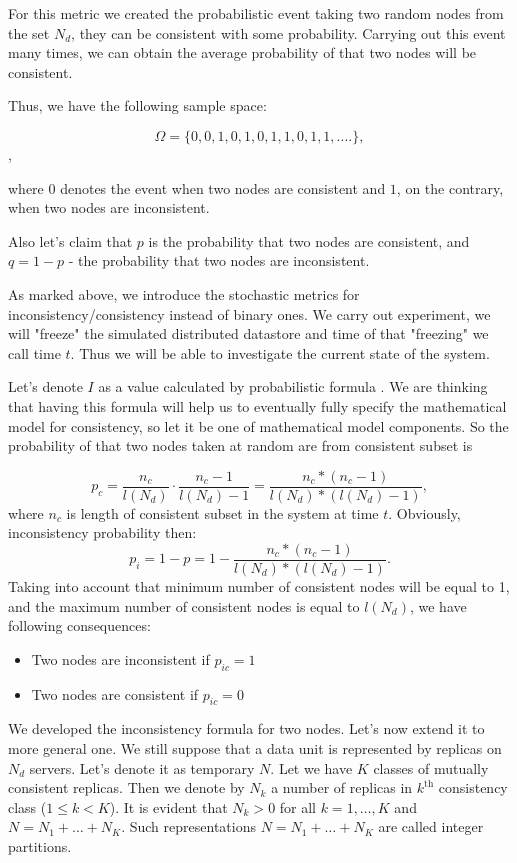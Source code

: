 \documentclass[a4paper,14pt]{llncs}
\begin{document}
For this metric we created the probabilistic event taking two random nodes from the set $N_d$, they can be consistent with some probability. Carrying out this event many times, we can obtain the average probability of that two nodes will be consistent.


Thus, we have the following sample space:

\[\Omega = \{0, 0, 1, 0, 1, 0, 1 , 1, 0, 1, 1, ....\}, \],

where $0$ denotes the event when two nodes are consistent and $1$, on the contrary, when two nodes are inconsistent.

Also let's claim that $p$ is the probability that two nodes are consistent, and
$q = 1 -p$ - the probability that two nodes are inconsistent.


As marked above, we introduce the stochastic metrics for inconsistency/consistency instead of binary ones.
We carry out experiment, we will "freeze" the simulated distributed datastore and time of that "freezing" we call time $t$. Thus we will be able to investigate the current state of the system.

Let's denote  $I$ as a value calculated by probabilistic formula .
We are thinking that having this formula will help us to eventually fully specify the mathematical model for consistency, so let it be one of mathematical model components.
So the probability of that two nodes taken at random are from consistent subset is

\[p_c = \frac{n_c}{l(N_d)} \cdot \frac{n_c - 1}{l(N_d) - 1} = \frac{n_c * (n_c - 1)}{l(N_d)* (l(N_d) -1)},\]
 where $n_c$ is length of consistent subset in the system at time $t$.
Obviously, inconsistency probability then:
\[p_{i} = 1 - p = 1 - \frac{n_c * (n_c - 1)}{l(N_d)* (l(N_d) -1)}.\]
Taking into account that minimum number of consistent nodes will be equal to 1, and the maximum number of consistent nodes is equal to $l(N_d)$, we have following consequences:
\begin{itemize}
\item Two nodes are inconsistent if  $p_{ic} = 1$
\item Two nodes are consistent if $p_{ic} = 0$ 
\end{itemize}

We developed the inconsistency formula for two nodes. Let's now extend it to more general one.
We still suppose that a data unit is represented by replicas on $N_d$ servers. Let's denote it as temporary $N$.
Let we have $K$ classes of mutually consistent replicas.
Then we denote by $N_k$ a number of replicas in $k^\mathrm{th}$ consistency class ($1\leq k<K$).
It is evident that $N_k>0$ for all $k=1,\ldots,K$ and $N=N_1+\ldots+N_K$.
Such representations $N=N_1+\ldots+N_K$ are called integer partitions.
\end{document}
